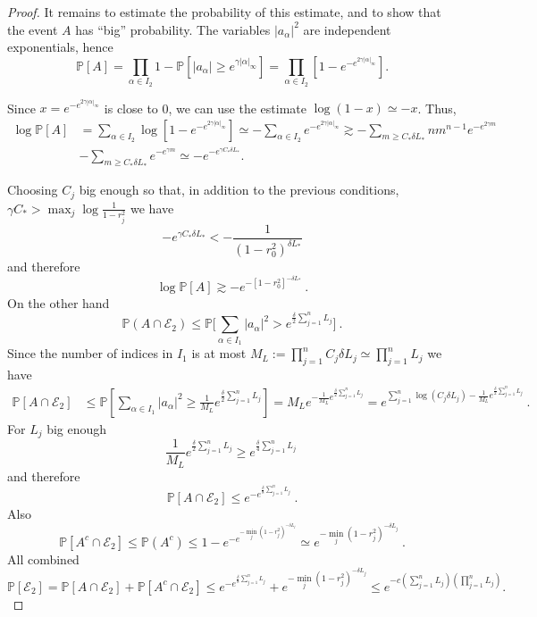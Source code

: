 \documentclass[12pt,twoside,final,amsfonts]{amsart}
\theoremstyle{plain}
\theoremstyle{definition}
\theoremstyle{definition}
\begin{document}
\begin{proof}
It remains to estimate the probability of this estimate, and to show that the event $A$ has ``big'' probability. The variables $|a_\alpha|^2$ are independent exponentials, hence
\[
\mathbb P[A]=\prod_{\alpha\in I_2}1-\mathbb P[|a_{\alpha}|\geq e^{\gamma|\alpha|_\infty}]
=\prod_{\alpha\in I_2}\left[1-e^{-e^{2\gamma |\alpha|_\infty}}\right].
\]

Since $x=e^{-e^{2\gamma |\alpha|_\infty}}$ is close to 0, we can use the estimate $\log(1-x)\simeq -x$. Thus, 
\begin{align*}
\log \mathbb P[A]&=\sum_{\alpha\in I_2}\log\left[1-e^{-e^{2\gamma |\alpha|_\infty}}\right]\simeq -
\sum_{\alpha\in I_2} e^{-e^{2\gamma |\alpha|_\infty}}\gtrsim -\sum_{m\geq C_*\delta L_*}n m^{n-1} e^{-e^{2\gamma m}}\\
&- \sum_{m\geq C_*\delta L_*} e^{-e^{\gamma m}}\simeq - e^{-e^{\gamma C_*\delta L_*}} .
\end{align*}

Choosing $C_j$ big enough so that, in addition to the previous conditions, $\gamma C_*>\max_j \log\frac{1}{1-r_j^2}$  we have
\[
 -e^{\gamma C_*\delta L_*}< -\frac 1{(1-r_0^2)^{\delta L_*}}
\]
and therefore
\[
 \log \mathbb P[A]\gtrsim -e^{-[1-r_0^2]^{-\delta L_*}}\ .
\]
On the other hand
\[
 \mathbb P(A\cap\mathcal E_2)\leq\mathbb P\bigl[\sum_{\alpha\in I_1} |a_{\alpha}|^2>e^{\frac{\delta}2 {\sum_{j=1}^n L_j}}\bigr]\ .
\]
Since the number of indices in $I_1$ is at most $M_L:=\prod_{j=1}^n C_j\delta L_j\simeq {\prod_{j=1}^n L_j}$ we have
\begin{align*}
\mathbb P[A\cap \mathcal E_2]&\leq \mathbb P\left[ \sum_{\alpha\in I_1} |a_{\alpha}|^2 \geq \frac 1{M_L} e^{\frac{\delta}2 {\sum_{j=1}^n L_j}}  \right]
= M_L e^{-\frac 1{M_L} e^{\frac{\delta}2 {\sum_{j=1}^n L_j}}}=e^{\sum_{j=1}^n\log(C_j\delta L_j)-\frac 1{M_L} e^{\frac{\delta}2 {\sum_{j=1}^n L_j}}}\ .
\end{align*}
For $L_j$ big enough
\[
 \frac 1{M_L} e^{\frac{\delta}2 {\sum_{j=1}^n L_j}}\geq e^{\frac{\delta}4 {\sum_{j=1}^n L_j}}\ 
\]
and therefore
\[
 \mathbb P[A\cap\mathcal E_2]\leq e^{-e^{\frac{\delta}8 {\sum_{j=1}^n L_j}}}\ .
\]
Also
\[
 \mathbb P[A^c\cap\mathcal E_2]\leq \mathbb P(A^c)\leq 1-e^{-e^{-\min\limits_j (1-r_j^2)^{-\delta L_j}}}\simeq e^{-\min\limits_j (1-r_j^2)^{-\delta L_j}} \ .
\]
All combined 
\[
\mathbb P[\mathcal E_2]=\mathbb P[A\cap \mathcal E_2]+\mathbb P[A^c\cap \mathcal E_2]\leq e^{-e^{\frac{\delta}8 {\sum_{j=1}^n L_j}}}+ e^{-\min\limits_j (1-r_j^2)^{-\delta L_j}}\leq e^{-c{(\sum_{j=1}^n L_j)(\prod_{j=1}^n L_j)}} .
\]
\end{proof}
\end{document}
